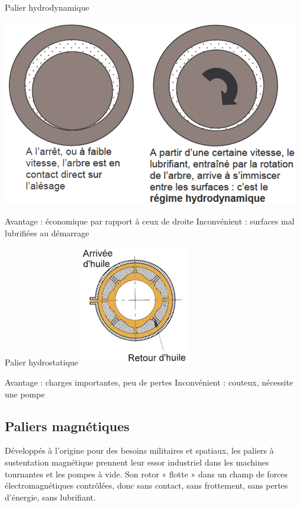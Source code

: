 \documentclass[11pt,oneside]{article}
\begin{document}
\noindent\begin{minipage}[c]{.55\linewidth}
\begin{center}
Palier hydrodynamique

\includegraphics[width=.6\textwidth]{png/fig29}
\end{center}
Avantage : économique par rapport à ceux de droite
Inconvénient : surfaces mal lubrifiées au démarrage	
\end{minipage}\hfill
\begin{minipage}[c]{.35\linewidth}
\begin{center}
Palier hydrostatique
\includegraphics[width=.6\textwidth]{png/fig30}
\end{center}
Avantage : charges importantes, peu de pertes
Inconvénient : couteux, nécessite une pompe
\end{minipage}

	
 	

\subsection{Paliers magnétiques}

Développés à l'origine pour des besoins militaires et spatiaux, les paliers à sustentation magnétique prennent leur essor industriel dans les machines tournantes et les pompes à vide.
Son rotor « flotte » dans un champ de forces électromagnétiques contrôlées, donc sans contact, sans frottement, sans pertes d'énergie, sans lubrifiant.
\end{document}
